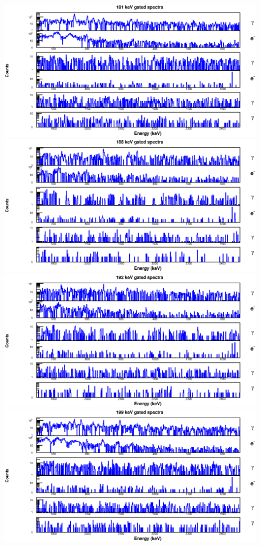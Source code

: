 \begin{landscape}
\includegraphics[scale=1.2]{154Gd_Appendix/181_combined.eps}
\includegraphics[scale=1.2]{154Gd_Appendix/188_combined.eps}
\includegraphics[scale=1.2]{154Gd_Appendix/192_combined.eps}
\includegraphics[scale=1.2]{154Gd_Appendix/199_combined.eps}

\end{landscape}
